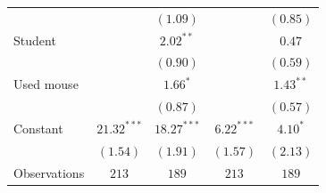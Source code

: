\begin{tabular}{l c c c c}
                         &               & $(1.09)$      &              & $(0.85)$    \\
Student                  &               & $2.02^{**}$   &              & $0.47$      \\
                         &               & $(0.90)$      &              & $(0.59)$    \\
Used mouse               &               & $1.66^{*}$    &              & $1.43^{**}$ \\
                         &               & $(0.87)$      &              & $(0.57)$    \\
Constant                 & $21.32^{***}$ & $18.27^{***}$ & $6.22^{***}$ & $4.10^{*}$  \\
                         & $(1.54)$      & $(1.91)$      & $(1.57)$     & $(2.13)$    \\
\midrule
Observations                & $213$         & $189$         & $213$        & $189$       \\
\bottomrule
\end{tabular}
